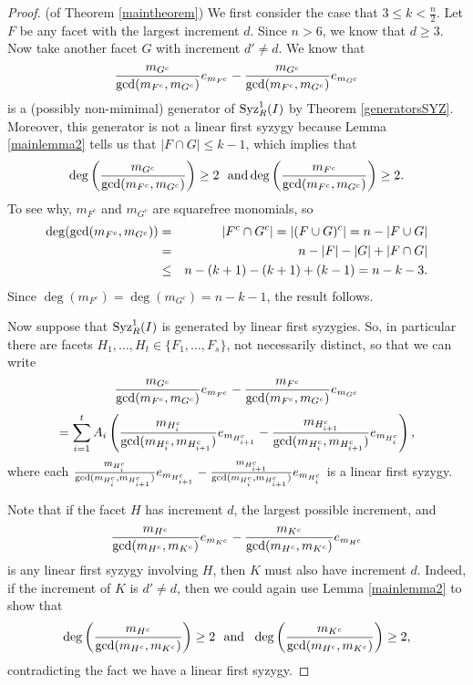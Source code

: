 \documentclass[12pt]{amsart}
\numberwithin{equation}{section}
\theoremstyle{definition}
\begin{document}
\begin{proof}{(of Theorem \ref{maintheorem})}
We first consider the case that $3 \leq k < \frac{n}{2}$.   Let
$F$ be any facet with the largest increment $d$.  Since $n >6$, we know that
$d \geq 3$.  Now take another facet $G$ with increment $d' \neq d$.
We know that 
\[
\frac{m_{G^c}}{{\rm gcd}(m_{F^c},m_{G^c})}e_{m_{F^c}} - 
\frac{m_{G^c}}{{\rm gcd}(m_{F^c},m_{G^c})}e_{m_{G^c}}
\]
is a (possibly non-mimimal) 
generator of ${\rm Syz}_R^1(I)$ by Theorem \ref{generatorsSYZ}.
Moreover, this generator is not a linear first syzygy because
Lemma \ref{mainlemma2} tells us that $|F \cap G| \leq k-1$,
which implies that 
\[\deg \left(\frac{m_{G^c}}{{\rm gcd}(m_{F^c},m_{G^c})}\right) \geq 2 ~~\mbox{and}
\deg \left(\frac{m_{F^c}}{{\rm gcd}(m_{F^c},m_{G^c})} \right)  \geq 2.
\]
To see why, $m_{F^c}$ and $m_{G^c}$ are squarefree monomials, so
\begin{eqnarray*}
\deg ({\rm gcd}(m_{F^c},m_{G^c})) &=& |F^c \cap G^c| = |(F \cup G)^c| 
=  n - |F \cup G| \\
&=& n - |F| - |G| + |F \cap G| \\
&\leq&
 n - (k+1) - (k+1) + (k-1) = n - k -3.
\end{eqnarray*}
Since $\deg (m_{F^c}) = \deg (m_{G^c}) = n - k -1$, the result follows.

Now suppose that ${\rm Syz}_R^1(I)$ is generated by linear first syzygies.
So, in particular there are facets $H_1,\ldots,H_t \in \{F_1,\ldots,F_s\}$,
not necessarily distinct,
so that we can write
\begin{equation}\label{equality}
\frac{m_{G^c}}{{\rm gcd}(m_{F^c},m_{G^c})}e_{m_{F^c}} - 
\frac{m_{F^c}}{{\rm gcd}(m_{F^c},m_{G^c})}e_{m_{G^c}} 
\end{equation}
\[
= \sum_{i=1}^t A_i\left(\frac{m_{H_i^c}}{{\rm gcd}(m_{H_i^c},m_{H_{i+1}^c})}
e_{m_{H_{i+1}^c}} - 
\frac{m_{H_{i+1}^c}}{{\rm gcd}(m_{H_i^c},m_{H_{i+1}^c})}e_{m_{H_i^c}}\right),\]
where each 
$\frac{m_{H_i^c}}{{\rm gcd}(m_{H_i^c},m_{H_{i+1}^c})}
e_{m_{H_{i+1}^c}} - 
\frac{m_{H_{i+1}^c}}{{\rm gcd}(m_{H_i^c},m_{H_{i+1}^c})}e_{m_{H_i^c}}$ is 
a linear first syzygy.  

Note that if the facet $H$ has increment $d$,
the largest possible increment,
and 
\[\frac{m_{H^c}}{{\rm gcd}(m_{H^c},m_{K^c})}
e_{m_{K^c}} - 
\frac{m_{K^c}}{{\rm gcd}(m_{H^c},m_{K^c})}e_{m_{H^c}}\]
is any linear first syzygy involving $H$, then $K$
must also have increment $d$.  Indeed, if the
increment of $K$ is $d'\neq d$, then we could again use
Lemma \ref{mainlemma2} to show that 
\[\deg \left(\frac{m_{H^c}}{{\rm gcd}(m_{H^c},m_{K^c})}\right) \geq 2
~~\mbox{and}~~
\deg \left(\frac{m_{K^c}}{{\rm gcd}(m_{H^c},m_{K^c})}\right) \geq 2,\]
contradicting the fact we have a linear first syzygy.


\end{proof}
\end{document}

